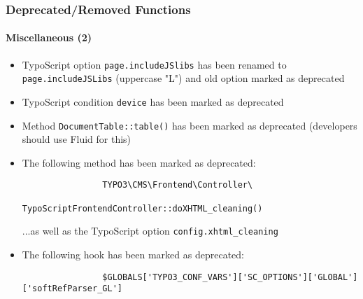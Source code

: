 \begin{frame}[fragile]
	\frametitle{Deprecated/Removed Functions}
	\framesubtitle{Miscellaneous (2)}

	\begin{itemize}
		\item TypoScript option \texttt{page.includeJSlibs} has been renamed to\newline
			\texttt{page.includeJSLibs} (uppercase "L") and old option marked as deprecated

		\item TypoScript condition \texttt{device} has been marked as deprecated

		\item Method \texttt{DocumentTable::table()} has been marked as deprecated\newline
			\small(developers should use Fluid for this)\normalsize

		\item The following method has been marked as deprecated:
			\begin{lstlisting}
				TYPO3\CMS\Frontend\Controller\
				    TypoScriptFrontendController::doXHTML_cleaning()
			\end{lstlisting}
			...as well as the TypoScript option
			\small
				\texttt{config.xhtml\_cleaning}
			\normalsize

		\item The following hook has been marked as deprecated:
			\begin{lstlisting}
				$GLOBALS['TYPO3_CONF_VARS']['SC_OPTIONS']['GLOBAL']['softRefParser_GL']
			\end{lstlisting}
 
	\end{itemize}

\end{frame}


